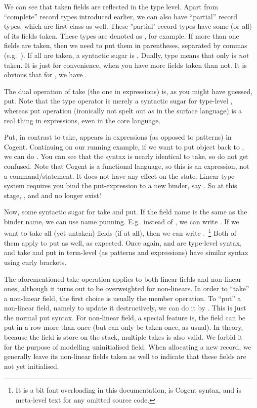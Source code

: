 \documentclass[a4paper]{article}
\newcommand{\cogent}{Cogent\xspace}
\begin{document}
We can see that taken fields are reflected in the type level. Apart from ``complete'' record types introduced earlier, we can also
have ``partial'' record types, which are first class as well. These "partial" record types have
some (or all) of its fields taken. These types are denoted as , for example. If more than one fields are taken, then we need to put them in parentheses,
separated by commas (e.g.\ ). If all are taken, a syntactic sugar is . Dually, type  means that only  is
\emph{not} taken. It is just for convenience, when you have more fields taken than not. It is obvious that for , we have
.

The dual operation of take (the one in expressions) is, as you might have guessed, put. Note that the type operator 
 is merely a syntactic sugar for type-level ,
whereas put operation (ironically not spelt out as  in the
surface language) is a real thing in expressions, even in the core language.

Put, in contrast to take, appears in expressions (as opposed to patterns) in \cogent. Continuing on our running example, if we want to put object  back to
, we can do . You can see that the syntax is nearly identical to take, so do not get confused.
Note that \cogent is a functional language, so this is an expression, not a command/statement. It does not have any effect on the state.
Linear type system requires you bind the put-expression to a new binder, say . 
So at this stage, , and  and  no longer exist!

Now, some syntactic sugar for take and put. If the field name is the same as the binder name, we can use name punning. E.g.\ instead of
, we can write . If we want to take all (yet untaken) fields (if at all), then we can write
.~\footnote{It is a bit font overloading in this documentation, 
 is \cogent syntax, and  is meta-level text for any omitted source code.}
Both of them apply to put as well, as expected. Once again,  and  are type-level
syntax, and take and put in term-level (as patterns and expressions) have similar syntax using curly brackets.

The aforementioned take operation applies to both linear fields and non-linear ones, although it turns out to be overweighted for non-linears. In order to ``take'' a non-linear field, the first
choice is usually the member operation. To ``put'' a non-linear field, namely to update it
destructively, we can do it by . This is just the normal
put syntax. For non-linear field, a special feature is, the field can be put 
in a row more than once (but can only be taken once, as usual). In theory, because the field
is store on the stack, multiple takes is also valid. We forbid it for the purpose of modelling
uninitialised field. When allocating a new record, we generally leave its non-linear fields
taken as well to indicate that these fields are not yet initialised.
\end{document}
